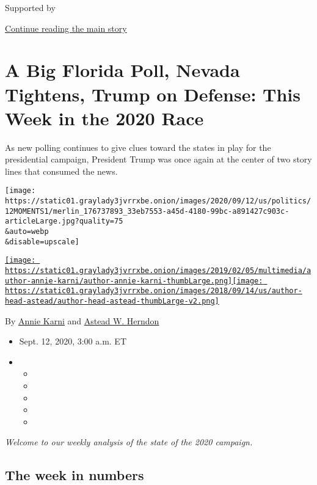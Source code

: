 Supported by

\protect\hyperlink{after-sponsor}{Continue reading the main story}

\hypertarget{a-big-florida-poll-nevada-tightens-trump-on-defense-this-week-in-the-2020-race}{%
\section{A Big Florida Poll, Nevada Tightens, Trump on Defense: This
Week in the 2020
Race}\label{a-big-florida-poll-nevada-tightens-trump-on-defense-this-week-in-the-2020-race}}

As new polling continues to give clues toward the states in play for the
presidential campaign, President Trump was once again at the center of
two story lines that consumed the news.

\texttt{[image: https://static01.graylady3jvrrxbe.onion/images/2020/09/12/us/politics/12MOMENTS1/merlin\_176737893\_33eb7553-a45d-4180-99bc-a891427c903c-articleLarge.jpg?quality=75\\\&auto=webp\\\&disable=upscale]}

\href{https://www.nytimes3xbfgragh.onion/by/annie-karni}{\texttt{[image: https://static01.graylady3jvrrxbe.onion/images/2019/02/05/multimedia/author-annie-karni/author-annie-karni-thumbLarge.png]}}\href{https://www.nytimes3xbfgragh.onion/by/astead-w-herndon}{\texttt{[image: https://static01.graylady3jvrrxbe.onion/images/2018/09/14/us/author-head-astead/author-head-astead-thumbLarge-v2.png]}}

By \href{https://www.nytimes3xbfgragh.onion/by/annie-karni}{Annie Karni}
and \href{https://www.nytimes3xbfgragh.onion/by/astead-w-herndon}{Astead
W. Herndon}

\begin{itemize}
\item
  Sept. 12, 2020, 3:00 a.m. ET
\item
  \begin{itemize}
  \item
  \item
  \item
  \item
  \item
  \end{itemize}
\end{itemize}

\emph{Welcome to our weekly analysis of the state of the 2020 campaign.}

\hypertarget{the-week-in-numbers}{%
\subsection{The week in numbers}\label{the-week-in-numbers}}


